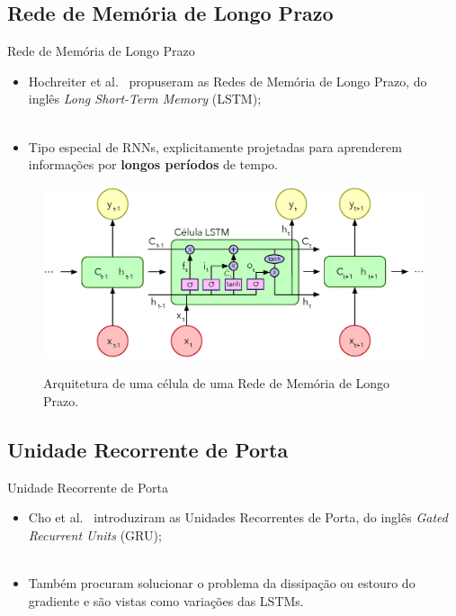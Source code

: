 \subsection{Rede de Memória de Longo Prazo}
\label{ss.lstm}

\begin{frame}{Rede de Memória de Longo Prazo}
	\begin{itemize}
		\justifying
		\item Hochreiter et al.~\cite{Hochreiter:97} propuseram as Redes de Memória de Longo Prazo, do inglês \emph{Long Short-Term Memory} (LSTM);
		\\~\\
		\item Tipo especial de RNNs, explicitamente projetadas para aprenderem informações por \textbf{longos períodos} de tempo.
	\end{itemize}
\end{frame}

\begin{frame}
	\begin{figure}[!ht]
		\centering
		\includegraphics[scale=0.4]{figs/lstm.eps}	
		\label{f.lstm}
		\caption{Arquitetura de uma célula de uma Rede de Memória de Longo Prazo.}
	\end{figure}
\end{frame}

\subsection{Unidade Recorrente de Porta}
\label{ss.gru}

\begin{frame}{Unidade Recorrente de Porta}
	\begin{itemize}
		\justifying
		\item Cho et al.~\cite{Cho:14} introduziram as Unidades Recorrentes de Porta, do inglês \emph{Gated Recurrent Units} (GRU);
		\\~\\
		\item Também procuram solucionar o problema da dissipação ou estouro do gradiente e são vistas como variações das LSTMs.	
	\end{itemize}
\end{frame}

